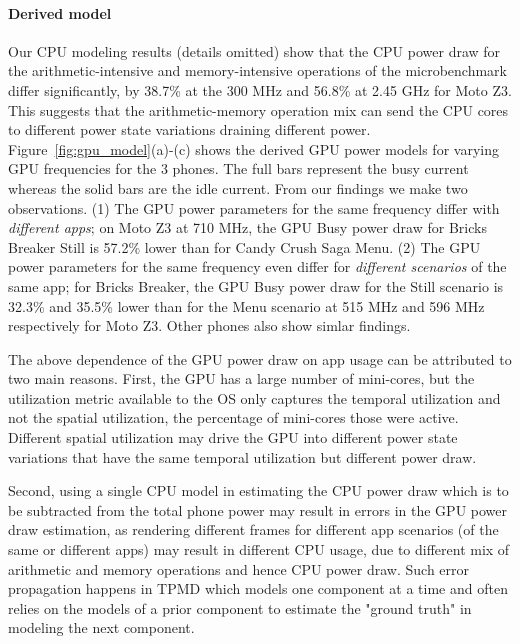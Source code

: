 \paragraph{Derived model}
Our CPU modeling results (details omitted) show that
the CPU power draw for the arithmetic-intensive and memory-intensive
operations of the microbenchmark differ significantly,
by 38.7\% at the 300 MHz and 56.8\% at 2.45 GHz for Moto Z3.
This suggests that the arithmetic-memory operation mix can send the CPU cores
to different power state variations draining different power.
Figure~\ref{fig:gpu_model}(a)-(c) shows the derived GPU power models for varying GPU frequencies for the 3 phones. The full bars represent the busy current whereas the solid bars are the idle current.
From our findings we make two observations.
(1) The GPU power parameters for the same frequency differ with {\it different apps}; on Moto Z3 at 710 MHz, the GPU Busy power draw for Bricks Breaker Still is 57.2\% lower than for Candy Crush Saga Menu.
(2) The GPU power parameters for the same frequency even differ for {\it different scenarios} 
of the same app; for Bricks Breaker, the GPU Busy power draw
for the Still scenario is 32.3\% and 35.5\% lower than for the Menu scenario  at 515 MHz and 596 MHz respectively for Moto Z3.
Other phones also show simlar findings.

The above dependence of the GPU power draw on app usage can be attributed  to two main reasons.
First, the GPU has a large number of mini-cores, but the utilization metric available to the OS only captures the temporal utilization and not the spatial utilization, \ie the percentage of mini-cores those were active.
Different spatial utilization may drive the GPU into different power state variations that have the same temporal utilization but different power draw.


Second, using a single CPU model in estimating the CPU power draw which is to be subtracted from the total phone power may result in errors in the GPU power draw  estimation,
 as rendering different frames for different app scenarios (of the same or different apps) may result in different CPU usage, \eg due to different mix of arithmetic and memory operations and hence CPU power draw.
Such error propagation happens in TPMD which models one component at a time
and often relies on the models of a  prior component to estimate the "ground truth" in modeling  the next component. 

